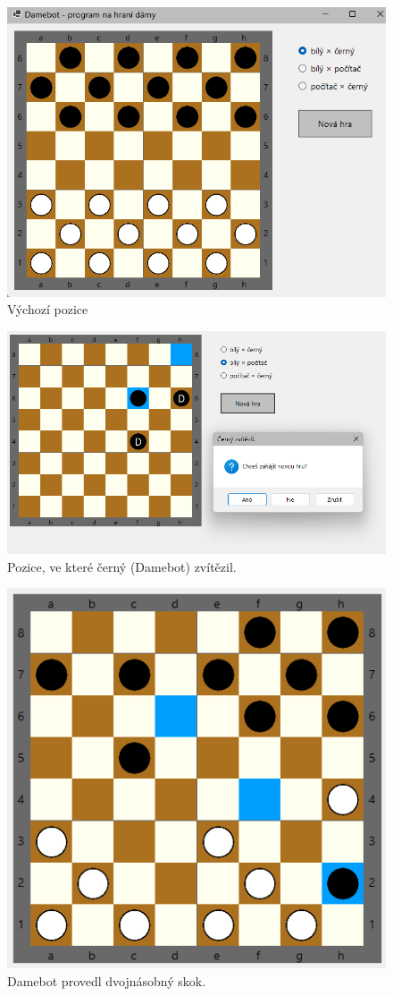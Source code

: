 \documentclass[a4paper,12pt]{article}
\begin{document}
	\begin{figure}[h]
		\centering
		\includegraphics{img/uživatelské_rozhraní}
		\caption{Výchozí pozice}
	\end{figure}

	\begin{figure}[h]
		\centering
		\includegraphics[width=\linewidth]{img/konec_hry}
		\caption{Pozice, ve které černý (Damebot) zvítězil.}
	\end{figure}

	\begin{figure}[h]
		\centering
		\includegraphics{img/dvojnásobný_skok}
		\caption{Damebot provedl dvojnásobný skok.}
	\end{figure}
\end{document}
